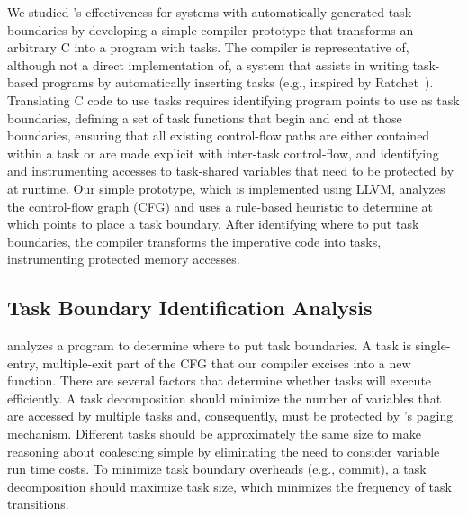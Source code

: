 We studied \sys's effectiveness for systems with automatically generated task
boundaries by developing a simple compiler prototype that transforms an
arbitrary C into a program with tasks. The compiler is representative of,
although not a direct implementation of, a system that assists in writing
task-based programs by automatically inserting tasks (e.g., inspired by
Ratchet~\cite{ratchet}). 
%
Translating C code to use tasks requires identifying program points to use as
task boundaries, defining a set of task functions that begin and end at those
boundaries, ensuring that all existing control-flow paths are either contained
within a task or are made explicit with inter-task control-flow, and identifying
and instrumenting accesses to task-shared variables that need to be protected
by \sys at runtime. Our simple prototype, which is implemented using LLVM, analyzes the
control-flow graph (CFG) and uses a rule-based heuristic to determine at which
points to place a task boundary. After identifying where to put task
boundaries, the \sys compiler transforms the imperative code into tasks,
instrumenting protected memory accesses. 

\subsection{Task Boundary Identification Analysis}
\label{sec:compiler_analysis_pass}

\sys analyzes a program to determine where to put task boundaries. 
%
A task is single-entry, multiple-exit part of the CFG that our compiler excises
into a new function.  
%
There are several factors that determine whether tasks will execute
efficiently. A task decomposition should minimize the number of variables that
are accessed by multiple tasks and, consequently, must be protected by \sys's
paging mechanism. 
%
Different tasks should be approximately the same size to make reasoning about
coalescing simple by eliminating the need to consider variable run time costs. 
%
To minimize task boundary overheads (e.g., commit), a task decomposition should
maximize task size, which minimizes the frequency of task transitions.

